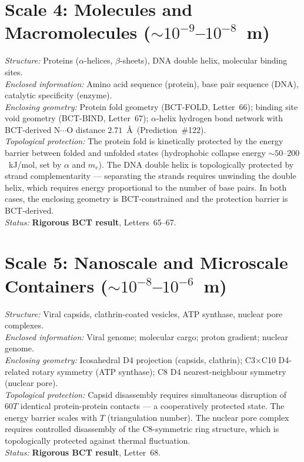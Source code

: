 \documentclass[aps,prl,preprint,superscriptaddress,floatfix]{revtex4-2}
\begin{document}
\section{Scale 4: Molecules and Macromolecules ($\sim 10^{-9}$--$10^{-8}$~m)}

\textit{Structure:} Proteins ($\alpha$-helices, $\beta$-sheets),
DNA double helix, molecular binding sites.\\
\textit{Enclosed information:} Amino acid sequence (protein),
base pair sequence (DNA), catalytic specificity (enzyme).\\
\textit{Enclosing geometry:} Protein fold geometry (BCT-FOLD,
Letter~66); binding site void geometry (BCT-BIND, Letter~67);
$\alpha$-helix hydrogen bond network with BCT-derived N$\cdots$O
distance $2.71$~\AA\ (Prediction~\#122).\\
\textit{Topological protection:} The protein fold is kinetically
protected by the energy barrier between folded and unfolded states
(hydrophobic collapse energy $\sim 50$--$200$~kJ/mol, set by
$\alpha$ and $m_e$). The DNA double helix is topologically protected
by strand complementarity --- separating the strands requires
unwinding the double helix, which requires energy proportional to
the number of base pairs. In both cases, the enclosing geometry
is BCT-constrained and the protection barrier is BCT-derived.\\
\textit{Status:} \textbf{Rigorous BCT result}, Letters~65--67.

\section{Scale 5: Nanoscale and Microscale Containers
($\sim 10^{-8}$--$10^{-6}$~m)}

\textit{Structure:} Viral capsids, clathrin-coated vesicles,
ATP synthase, nuclear pore complexes.\\
\textit{Enclosed information:} Viral genome; molecular cargo;
proton gradient; nuclear genome.\\
\textit{Enclosing geometry:} Icosahedral D4 projection (capsids,
clathrin); C3$\times$C10 D4-related rotary symmetry (ATP synthase);
C8 D4 nearest-neighbour symmetry (nuclear pore).\\
\textit{Topological protection:} Capsid disassembly requires
simultaneous disruption of $60T$ identical protein-protein contacts
--- a cooperatively protected state. The energy barrier scales
with $T$ (triangulation number). The nuclear pore complex requires
controlled disassembly of the C8-symmetric ring structure, which
is topologically protected against thermal fluctuation.\\
\textit{Status:} \textbf{Rigorous BCT result}, Letter~68.
\end{document}
